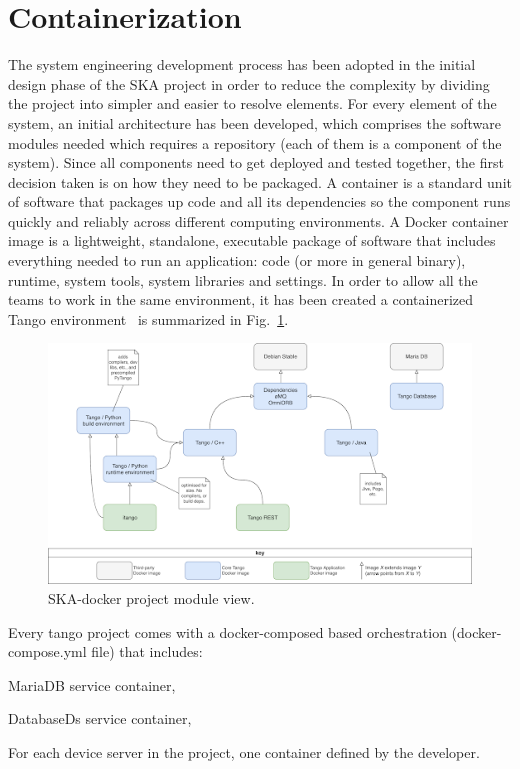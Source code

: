 \documentclass[a4paper,
               keeplastbox,   %
               ]{jacow}
\begin{document}
\section{Containerization}
The system engineering development process has been adopted in the initial design phase of the SKA project in order to reduce the complexity by dividing the project into simpler and easier to resolve elements. For every element of the system, an initial architecture has been developed, which comprises the software modules needed which requires a repository (each of them is a component of the system).
Since all components need to get deployed and tested together, the first decision taken is on how they need to be packaged.  A container is a standard unit of software that packages up code and all its dependencies so the component runs quickly and reliably across different computing environments. A Docker container image is a lightweight, standalone, executable package of software that includes everything needed to run an application: code (or more in general binary), runtime, system tools, system libraries and settings.
In order to allow all the teams to work in the same environment, it has been created a containerized Tango environment~\cite{SKA-docker} is summarized in Fig.~\ref{fig:skadocker}. 
\begin{figure}[!htb]
   \centering
   \includegraphics*[width=1\columnwidth]{ska-docker}
   \caption{SKA-docker project module view.}
   \label{fig:skadocker}
\end{figure}
Every tango project comes with a docker-composed based orchestration (docker-compose.yml file) that includes:
\begin{Itemize}
    \item MariaDB service container, 
    \item DatabaseDs service container,
    \item For each device server in the project, one container defined by the developer.
\end{Itemize}
\end{document}
